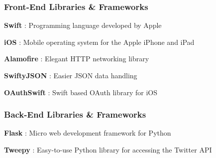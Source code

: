 \documentclass{article}
\begin{document}

\subsubsection*{Front-End Libraries \& Frameworks}
\begin{itemize*}
    \item \textbf{Swift} \cite{swift}: Programming language developed by Apple
    \item \textbf{iOS} \cite{ios}: Mobile operating system for the Apple iPhone and iPad
    \item \textbf{Alamofire} \cite{alamofire}: Elegant HTTP networking library
    \item \textbf{SwiftyJSON} \cite{swiftyjson}: Easier JSON data handling
    \item \textbf{OAuthSwift} \cite{oauthswift}: Swift based OAuth library for iOS
\end{itemize*}

\subsubsection*{Back-End Libraries \& Frameworks}
\begin{itemize*}
    \item \textbf{Flask} \cite{flask}: Micro web development framework for Python
    \item \textbf{Tweepy} \cite{tweepy}: Easy-to-use Python library for accessing the Twitter API
\end{itemize*}
\end{document}
